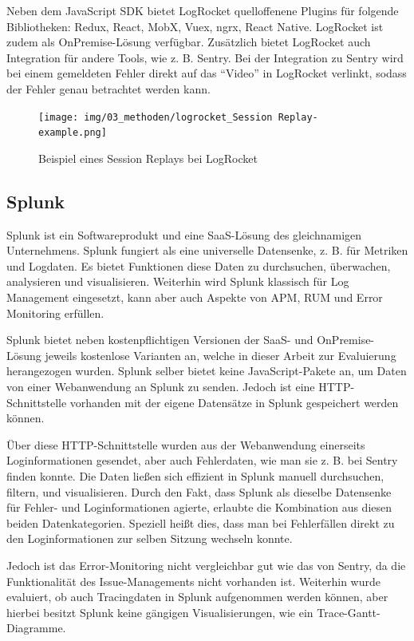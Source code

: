Neben dem JavaScript SDK bietet LogRocket quelloffenene Plugins für folgende Bibliotheken: Redux, React, MobX, Vuex, ngrx, React Native. LogRocket ist zudem als OnPremise-Lösung verfügbar. Zusätzlich bietet LogRocket auch Integration für andere Tools, wie z. B. Sentry. Bei der Integration zu Sentry wird bei einem gemeldeten Fehler direkt auf das \enquote{Video} in LogRocket verlinkt, sodass der Fehler genau betrachtet werden kann.

\begin{figure}[H]
	\centering
	\texttt{[image: img/03\_methoden/logrocket\_Session Replay-example.png]}
	\caption{Beispiel eines Session Replays bei LogRocket}
	\label{fig:logrocket-Session Replay-example}
\end{figure}

\subsection{Splunk}

Splunk \cite{Splunk} ist ein Softwareprodukt und eine SaaS-Lösung des gleichnamigen Unternehmens. Splunk fungiert als eine universelle Datensenke, z. B. für Metriken und Logdaten. Es bietet Funktionen diese Daten zu durchsuchen, überwachen, analysieren und visualisieren. Weiterhin wird Splunk klassisch für Log Management eingesetzt, kann aber auch Aspekte von APM, RUM und Error Monitoring erfüllen.

Splunk bietet neben kostenpflichtigen Versionen der SaaS- und OnPremise-Lösung jeweils kostenlose Varianten an, welche in dieser Arbeit zur Evaluierung herangezogen wurden. Splunk selber bietet keine JavaScript-Pakete an, um Daten von einer Webanwendung an Splunk zu senden. Jedoch ist eine HTTP-Schnittstelle vorhanden mit der eigene Datensätze in Splunk gespeichert werden können.

Über diese HTTP-Schnittstelle wurden aus der Webanwendung einerseits Loginformationen gesendet, aber auch Fehlerdaten, wie man sie z. B. bei Sentry finden konnte. Die Daten ließen sich effizient in Splunk manuell durchsuchen, filtern, und visualisieren. Durch den Fakt, dass Splunk als dieselbe Datensenke für Fehler- und Loginformationen agierte, erlaubte die Kombination aus diesen beiden Datenkategorien. Speziell heißt dies, dass man bei Fehlerfällen direkt zu den Loginformationen zur selben Sitzung wechseln konnte.

Jedoch ist das Error-Monitoring nicht vergleichbar gut wie das von Sentry, da die Funktionalität des Issue-Managements nicht vorhanden ist. Weiterhin wurde evaluiert, ob auch Tracingdaten in Splunk aufgenommen werden können, aber hierbei besitzt Splunk keine gängigen Visualisierungen, wie ein Trace-Gantt-Diagramme.

